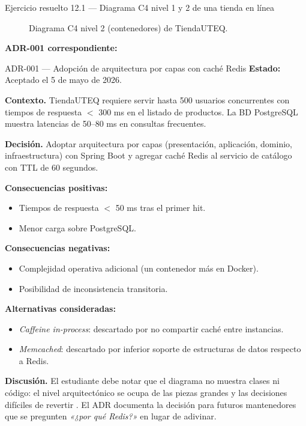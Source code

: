 \documentclass[11pt,a4paper,openany]{book}
\begin{document}
\begin{cajaejemplo}{Ejercicio resuelto 12.1 --- Diagrama C4 nivel 1 y 2 de una tienda en línea}
\begin{figure}[H]
\caption{Diagrama C4 nivel 2 (contenedores) de TiendaUTEQ.}
\end{figure}

\textbf{ADR-001 correspondiente:}

\begin{cajaadr}{ADR-001 --- Adopción de arquitectura por capas con caché Redis}
\textbf{Estado:} Aceptado el 5 de mayo de 2026.

\textbf{Contexto.} TiendaUTEQ requiere servir hasta 500
usuarios concurrentes con tiempos de respuesta $<$ 300 ms en el
listado de productos. La BD PostgreSQL muestra latencias de 50--80 ms
en consultas frecuentes.

\textbf{Decisión.} Adoptar arquitectura por capas (presentación,
aplicación, dominio, infraestructura) con Spring Boot y agregar caché
Redis al servicio de catálogo con TTL de 60 segundos.

\textbf{Consecuencias positivas:}
\begin{itemize}
\item Tiempos de respuesta $<$ 50 ms tras el primer hit.
\item Menor carga sobre PostgreSQL.
\end{itemize}

\textbf{Consecuencias negativas:}
\begin{itemize}
\item Complejidad operativa adicional (un contenedor más en Docker).
\item Posibilidad de inconsistencia transitoria.
\end{itemize}

\textbf{Alternativas consideradas:}
\begin{itemize}
\item \emph{Caffeine in-process}: descartado por no compartir caché
entre instancias.
\item \emph{Memcached}: descartado por inferior soporte de
estructuras de datos respecto a Redis.
\end{itemize}
\end{cajaadr}

\textbf{Discusión.} El estudiante debe notar que el diagrama no
muestra clases ni código: el nivel arquitectónico se ocupa de las
piezas grandes y las decisiones difíciles de revertir
\cite{bass2021software}. El ADR documenta la decisión para futuros
mantenedores que se pregunten \emph{«¿por qué Redis?»} en lugar de
adivinar.
\end{cajaejemplo}
\end{document}

